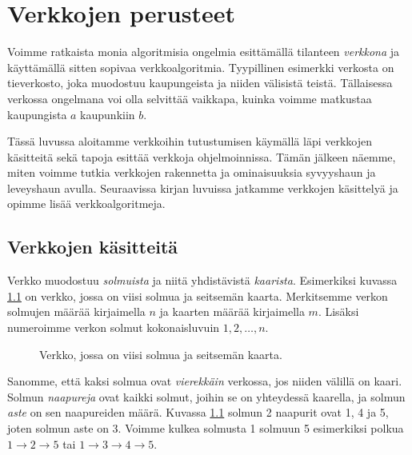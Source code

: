 \chapter{Verkkojen perusteet}

Voimme ratkaista monia algoritmisia ongelmia
esittämällä tilanteen \emph{verkkona} ja käyttämällä sitten
sopivaa verkkoalgoritmia.
Tyypillinen esimerkki verkosta on tieverkosto,
joka muodostuu kaupungeista ja niiden välisistä teistä.
Tällaisessa verkossa ongelmana voi olla selvittää vaikkapa,
kuinka voimme matkustaa kaupungista $a$ kaupunkiin $b$.

Tässä luvussa aloitamme verkkoihin tutustumisen
käymällä läpi verkkojen käsitteitä sekä tapoja
esittää verkkoja ohjelmoinnissa.
Tämän jälkeen näemme, miten voimme tutkia verkkojen rakennetta
ja ominaisuuksia syvyyshaun ja leveyshaun avulla.
Seuraavissa kirjan luvuissa jatkamme verkkojen käsittelyä ja
opimme lisää verkkoalgoritmeja.

\section{Verkkojen käsitteitä}

Verkko muodostuu \emph{solmuista} ja
niitä yhdistävistä \emph{kaarista}.
Esimerkiksi kuvassa \ref{fig:veresi} on verkko,
jossa on viisi solmua ja seitsemän kaarta.
Merkitsemme verkon solmujen
määrää kirjaimella $n$ ja kaarten määrää
kirjaimella $m$.
Lisäksi numeroimme verkon solmut kokonaisluvuin
$1,2,\dots,n$.

\begin{figure}
\center
\begin{center}
\end{center}
\caption{Verkko, jossa on viisi solmua ja seitsemän kaarta.}
\label{fig:veresi}
\end{figure}

Sanomme, että kaksi solmua ovat \emph{vierekkäin} verkossa,
jos niiden välillä on kaari.
Solmun \emph{naapureja} ovat kaikki solmut,
joihin se on yhteydessä kaarella,
ja solmun \emph{aste} on sen naapureiden määrä.
Kuvassa \ref{fig:veresi} solmun 2 naapurit ovat 1, 4 ja 5,
joten solmun aste on 3.
Voimme kulkea solmusta 1 solmuun 5
esimerkiksi polkua $1 \rightarrow 2 \rightarrow 5$
tai $1 \rightarrow 3 \rightarrow 4 \rightarrow 5$.

